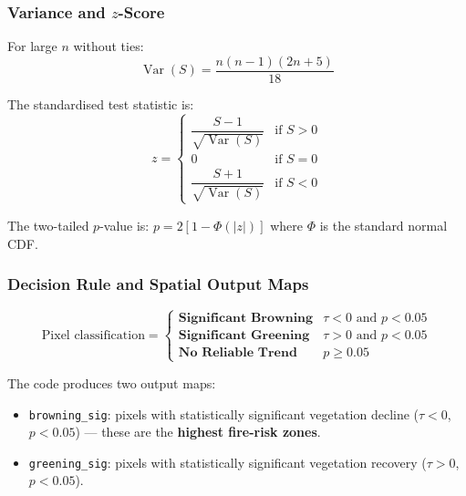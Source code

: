 \documentclass[12pt, a4paper]{article}
\begin{document}
\subsubsection{Variance and $z$-Score}

For large $n$ without ties:
\begin{equation}
  \operatorname{Var}(S) =
  \frac{n(n-1)(2n+5)}{18}
  \label{eq:mk_var}
\end{equation}

The standardised test statistic is:
\begin{equation}
  z =
  \begin{cases}
    \dfrac{S - 1}{\sqrt{\operatorname{Var}(S)}} & \text{if } S > 0 \\[8pt]
    0                                           & \text{if } S = 0 \\[4pt]
    \dfrac{S + 1}{\sqrt{\operatorname{Var}(S)}} & \text{if } S < 0
  \end{cases}
  \label{eq:mk_z}
\end{equation}

The two-tailed $p$-value is: $p = 2\left[1 - \Phi(|z|)\right]$
where $\Phi$ is the standard normal CDF.

\subsubsection{Decision Rule and Spatial Output Maps}

\begin{equation}
  \text{Pixel classification} =
  \begin{cases}
    \textbf{Significant Browning} & \tau < 0 \text{ and } p < 0.05 \\
    \textbf{Significant Greening} & \tau > 0 \text{ and } p < 0.05 \\
    \textbf{No Reliable Trend}    & p \ge 0.05
  \end{cases}
  \label{eq:mk_decision}
\end{equation}

The code produces two output maps:
\begin{itemize}[leftmargin=2em]
  \item \texttt{browning\_sig}: pixels with statistically
        significant vegetation decline ($\tau < 0$, $p < 0.05$)
        --- these are the \textbf{highest fire-risk zones}.
  \item \texttt{greening\_sig}: pixels with statistically
        significant vegetation recovery ($\tau > 0$, $p < 0.05$).
\end{itemize}
\end{document}
